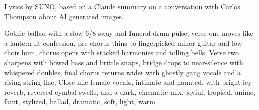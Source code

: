 
\begin{notes}
Lyrics by SUNO, based on a Claude summary on a conversation with Carlos Thompson about AI generated images.
\end{notes}
\begin{style}
Gothic ballad with a slow 6/8 sway and funeral-drum pulse; verse one moves like a lantern-lit confession, pre-chorus thins to fingerpicked minor guitar and low choir hum, chorus opens with stacked harmonies and tolling bells, Verse two sharpens with bowed bass and brittle snaps, bridge drops to near-silence with whispered doubles, final chorus returns wider with ghostly gang vocals and a rising string line, Close-mic female vocals, intimate and haunted, with bright icy reverb, reversed cymbal swells, and a dark, cinematic mix, joyful, tropical, anime, faint, stylized, ballad, dramatic, soft, light, warm
\end{style}
